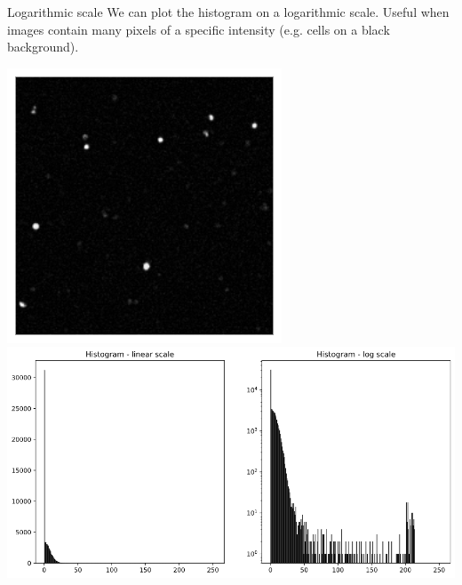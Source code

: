 \documentclass[9pt, aspectratio=169]{beamer}
\begin{document}
\begin{frame}
    {Logarithmic scale}
    We can plot the histogram on a logarithmic scale. Useful when images contain many pixels of a specific intensity (e.g. cells on a black background).

    \includegraphics[height=.5\textheight]{pit_cells.png}
    \includegraphics[height=.5\textheight]{pit_cells_histo_linear_vs_log.png}
\end{frame}
\end{document}
